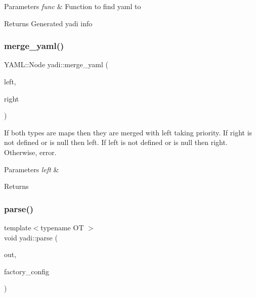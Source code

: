 \begin{DoxyParams}{Parameters}
{\em func} & Function to find yaml to \\
\hline
\end{DoxyParams}
\begin{DoxyReturn}{Returns}
Generated yadi info 
\end{DoxyReturn}
\mbox{\label{namespaceyadi_a495ab0c09cfb0aba37fd2115350d81d9}} 
\subsubsection{\texorpdfstring{merge\+\_\+yaml()}{merge\_yaml()}}
{\footnotesize\ttfamily Y\+A\+M\+L\+::\+Node yadi\+::merge\+\_\+yaml (\begin{DoxyParamCaption}\item[{Y\+A\+M\+L\+::\+Node const \&}]{left,  }\item[{Y\+A\+M\+L\+::\+Node const \&}]{right }\end{DoxyParamCaption})}

If both types are maps then they are merged with left taking priority. If right is not defined or is null then left. If left is not defined or is null then right. Otherwise, error. 
\begin{DoxyParams}{Parameters}
{\em left} & \\
\hline
\end{DoxyParams}
\begin{DoxyReturn}{Returns}

\end{DoxyReturn}
\mbox{\label{namespaceyadi_ace9d761848d60ab00f257fdd9f5f2f21}} 
\subsubsection{\texorpdfstring{parse()}{parse()}}
{\footnotesize\ttfamily template$<$typename OT $>$ \\
void yadi\+::parse (\begin{DoxyParamCaption}\item[{OT \&}]{out,  }\item[{Y\+A\+M\+L\+::\+Node const \&}]{factory\+\_\+config }\end{DoxyParamCaption})}



